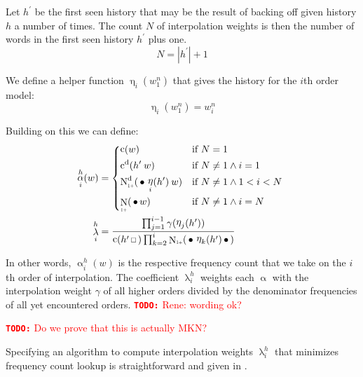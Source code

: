 \documentclass[m,bachelor,binding]{WeSTthesis}
\renewcommand\cref{\Cref}
\newcommand*{\Scale}[2][4]{\scalebox{#1}{$#2$}}%
\newcommand{\StringLength}[1]{\left|#1\right|}
\DeclareMathOperator{\Count}{c}
\DeclareMathOperator{\ContCount}{N}
\newcommand{\ContCountIp}  {\ContCount_{\Scale[0.5]{1+}}}
\newcommand{\Skp}{\ensuremath{\,\Scale[0.7]{\square}\,}}
\newcommand{\WSkp}{\ensuremath{\,\bullet\,}}
\DeclareMathOperator{\SumWeight}{\lambda}
\DeclareMathOperator{\SumArg}{\alpha}
\newcommand{\SeenHistory}{h^\prime}
\DeclareMathOperator{\History}{\eta}
\newcommand{\todo}[1]{\textcolor{red}{{\footnotesize\textbf{\texttt{TODO:}}} #1}}
\begin{document}
Let $\SeenHistory$ be the first seen history that may be the result of backing
off given history $h$ a number of times.
The count $N$ of interpolation weights is then the number of words in 
the first seen history $\SeenHistory$ plus one.
\begin{equation}
  N = \StringLength{\SeenHistory} + 1
\end{equation}

We define a helper function $\History_i(w_1^n)$ that gives the history for the
$i$th order model:
\begin{equation}
  \History_i(w_1^n) = w_i^n
\end{equation}

Building on this we can define:
\begin{align}
  \SumArg_i^h(w) &= 
    \begin{dcases*}
      \Count(w)                                              & if $N = 1$ \\
      \DiscountedCount(\SeenHistory \: w)                    & if $N \neq 1 \land i = 1$ \\
      \DiscountedCount*(\WSkp \History_i(\SeenHistory) \: w) & if $N \neq 1 \land 1 < i < N$ \\
      \ContCountIp(\WSkp w)                                  & if $N \neq 1 \land i = N$
    \end{dcases*} \\
  \SumWeight_i^h &= \frac{\prod_{j = 1}^{i - 1} \gamma(\History_j(\SeenHistory))}
                        {\Count(\SeenHistory \Skp) \prod_{k = 2}^{i} \ContCountIp(\WSkp \History_k(\SeenHistory) \WSkp)}
\end{align}

In other words, $\SumArg_i^h(w)$ is the respective frequency count that we take
on the $i$th order of interpolation.
The coefficient $\SumWeight_i^h$ weights each $\SumArg$ with the interpolation
weight $\gamma$ of all higher orders divided by the denominator frequencies of
all yet encountered orders.
\todo{Rene: wording ok?}

\todo{Do we prove that this is actually MKN?}

Specifying an algorithm to compute interpolation weights $\SumWeight_i^h$ that
minimizes frequency count lookup is straightforward and given in
\cref{alg:weightedsum-mkn}.
\end{document}
